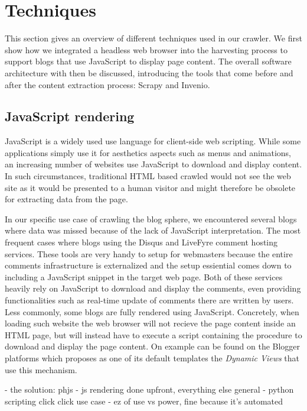 \section{Techniques}

This section gives an overview of different techniques used in our crawler. We first show how we integrated a headless web browser into the harvesting process to support blogs that use JavaScript to display page content. The overall software architecture with then be discussed, introducing the tools that come before and after the content extraction process: Scrapy and Invenio.

\subsection{JavaScript rendering}
JavaScript is a widely used use language for client-side web scripting. While some applications simply use it for aesthetics aspects such as menus and animations, an increasing number of websites use JavaScript to download and display content. In such circumstances, traditional HTML based crawled would not see the web site as it would be presented to a human visitor and might therefore be obsolete for extracting data from the page.

In our specific use case of crawling the blog sphere, we encountered several blogs where data was missed because of the lack of JavaScript interpretation. The most frequent cases where blogs using the Disqus and LiveFyre comment hosting services. These tools are very handy to setup for webmasters because the entire comments infrastructure is externalized and the setup essiential comes down to including a JavaScript snippet in the target web page. Both of these services heavily rely on JavaScript to download and display the comments, even providing functionalities such as real-time update of comments there are written by users. Less commonly, some blogs are fully rendered using JavaScript. Concretely, when loading such website the web browser will not recieve the page content inside an HTML page, but will instead have to execute a script containing the procedure to download and display the page content. On example can be found on the Blogger platforms which proposes as one of its default templates the \emph{Dynamic Views}  that use this mechanism.

- the solution: phjs
- js rendering done upfront, everything else general
- python scripting click click use case
- ez of use vs power, fine because it's automated

